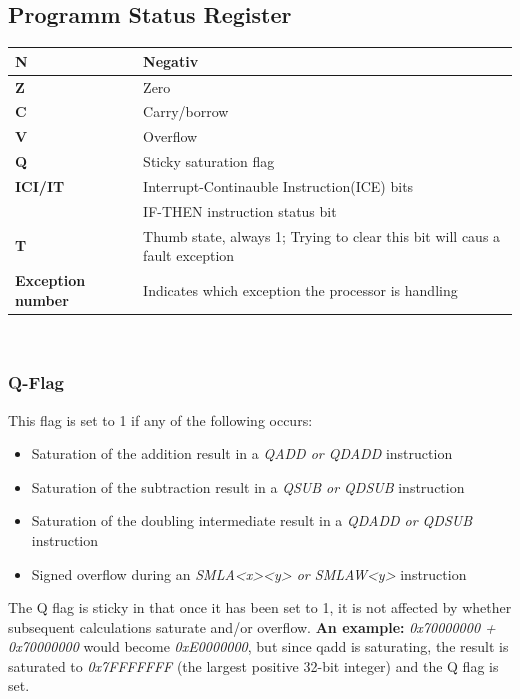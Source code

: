 \subsection{Programm Status Register}
\begin{minipage}{9cm}
	\begin{tabular}{|m{2cm}|m{6cm}|}
        \hline 
        \textbf{N}& Negativ \\ 
        \hline 
        \textbf{Z}& Zero  \\ 
        \hline 
        \textbf{C}& Carry/borrow  \\ 
        \hline 
        \textbf{V}& Overflow \\ 
        \hline 
        \textbf{Q}& Sticky saturation flag \\ 
        \hline 
        \textbf{ICI/IT}& Interrupt-Continauble Instruction(ICE) bits\\
                        & IF-THEN instruction status bit \\ 
        \hline 
        \textbf{T}& Thumb state, always 1; Trying to clear this bit will caus a fault exception \\ 
        \hline 
        \textbf{Exception number}& Indicates which exception the processor is handling \\ 
        \hline 
    \end{tabular} 
\end{minipage}
%
\begin{minipage}{0.5cm}
	\-\
\end{minipage}
%
\begin{minipage}{9cm}
	\subsubsection{Q-Flag}
This flag is set to 1 if any of the following occurs:
\begin{itemize}
    \item Saturation of the addition result in a \textit{QADD or QDADD} instruction
    \item Saturation of the subtraction result in a \textit{QSUB or QDSUB} instruction
    \item Saturation of the doubling intermediate result in a \textit{QDADD or QDSUB} instruction
    \item Signed overflow during an \textit{SMLA<x><y> or SMLAW<y>} instruction
\end{itemize}
The Q flag is sticky in that once it has been set to 1, it is not affected by whether subsequent calculations saturate and/or overflow.\newline
\textbf{An example:}\newline
\textit{0x70000000 + 0x70000000} would become \textit{0xE0000000}, but since qadd is saturating, the result is saturated to \textit{0x7FFFFFFF} (the largest positive 32-bit integer) and the Q flag is set.
\end{minipage}


